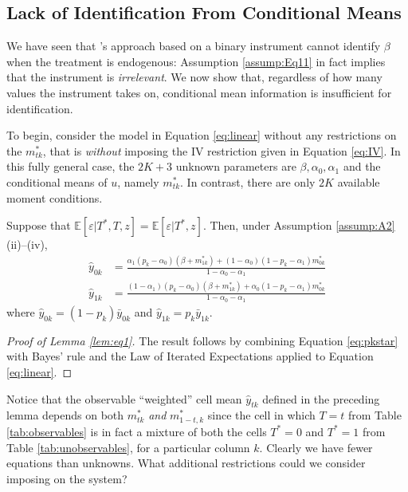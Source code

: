 
\subsection{Lack of Identification From Conditional Means}
We have seen that \cite{Mahajan}'s approach based on a binary instrument cannot identify $\beta$ when the treatment is endogenous: Assumption \ref{assump:Eq11} in fact implies that the instrument is \emph{irrelevant}. 
We now show that, regardless of how many values the instrument takes on, conditional mean information is insufficient for identification.

To begin, consider the model in Equation \ref{eq:linear} without any restrictions on the $m^*_{tk}$, that is \emph{without} imposing the IV restriction given in Equation \ref{eq:IV}.
In this fully general case, the $2K + 3$ unknown parameters are $\beta, \alpha_0, \alpha_1$ and the conditional means of $u$, namely $m^*_{tk}$.
In contrast, there are only $2K$ available moment conditions.
\begin{lem}
  Suppose that $\mathbb{E}\left[ \varepsilon|T^*,T,z \right]= \mathbb{E}\left[ \varepsilon|T^*,z \right]$. Then, under Assumption \ref{assump:A2} (ii)--(iv),
  \label{lem:eq1}
\begin{align}
  \label{eq:MC0}
  \hat{y}_{0k} &=\frac{\alpha_1(p_k - \alpha_0)(\beta + m_{1k}^*) + (1 - \alpha_0)(1 - p _k -  \alpha_1)m_{0k}^*}{1 - \alpha_0 - \alpha_1} \\[1.5ex]
  \label{eq:MC1}
  \hat{y}_{1k} &= \frac{(1-\alpha_1)(p_k - \alpha_0)(\beta+m_{1k}^*)+  \alpha_0(1-p_k - \alpha_1)m_{0k}^*}{1-\alpha_0 - \alpha_1}
\end{align}
where $\hat{y}_{0k} = (1-p_k)\bar{y}_{0k}$ and $\hat{y}_{1k}= p_k \bar{y}_{1k}$.
\end{lem}
\begin{proof}[Proof of Lemma \ref{lem:eq1}]
  The result follows by combining Equation \ref{eq:pkstar} with Bayes' rule and the Law of Iterated Expectations applied to Equation \ref{eq:linear}.
\end{proof}
Notice that the observable ``weighted'' cell mean $\hat{y}_{tk}$ defined in the preceding lemma depends on both $m^*_{tk}$ \emph{and} $m^*_{1-t,k}$ since the cell in which $T=t$ from Table \ref{tab:observables} is in fact a mixture of both the cells $T^*=0$ and $T^*=1$ from Table \ref{tab:unobservables}, for a particular column $k$.
Clearly we have fewer equations than unknowns.
What additional restrictions could we consider imposing on the system? 
